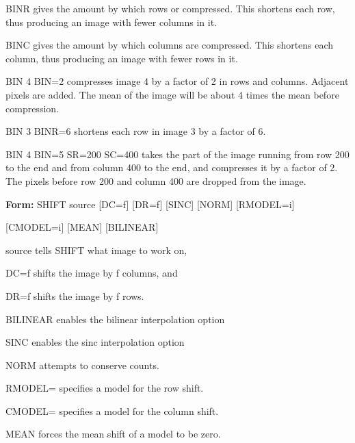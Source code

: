 {\newpage\clearpage
{}%
\begin{example}
  \item[BINR\hfill]{gives the amount by which rows or compressed.  This
       shortens each row, thus producing an image with
       fewer columns in it.}
  \item[BINC\hfill]{gives the amount by which columns are compressed.
       This shortens each column, thus producing an image
       with fewer rows in it.}
\end{example}%
\lthtmlfigureZ
\lthtmlcheckvsize\clearpage}

{\newpage\clearpage
{}%
\begin{example}
  \item[BIN 4 BIN=2\hfill]{compresses image 4 by a factor of 2
       in rows and columns.  Adjacent pixels
       are added.  The mean of the image will
       be about 4 times the mean before
       compression.}
  \item[BIN 3 BINR=6\hfill]{shortens each row in image 3 by a 
       factor of 6.}
  \item[BIN 4 BIN=5 SR=200 SC=400\hfill]{
       takes the part of the image running 
       from row 200 to the end and from
       column 400 to the end, and compresses
       it by a factor of 2.  The pixels 
       before row 200 and column 400 are
       dropped from the image.}
\end{example}%
\lthtmlfigureZ
\lthtmlcheckvsize\clearpage}

{\newpage\clearpage
{}%
\begin{command}
  \item[\textbf{Form: }SHIFT source {[DC=f]} {[DR=f]} {[SINC]} {[NORM]} 
       {[RMODEL=i]}\hfill]{}
  \item[]{{[CMODEL=i]} {[MEAN]} {[BILINEAR]}}
  \item[source]{tells SHIFT what image to work on,}
  \item[DC=f]{shifts the image by f columns, and}
  \item[DR=f]{shifts the image by f rows.}
  \item[BILINEAR]{enables the bilinear interpolation option}
  \item[SINC]{enables the sinc interpolation option}
  \item[NORM]{attempts to conserve counts.}
  \item[RMODEL=]{specifies a model for the row shift.}
  \item[CMODEL=]{specifies a model for the column shift.}
  \item[MEAN]{forces the mean shift of a model to be zero.}
\end{command}%
\lthtmlfigureZ
\lthtmlcheckvsize\clearpage}

